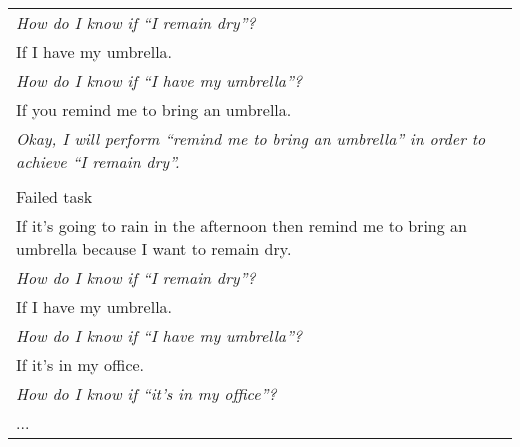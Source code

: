 \begin{table*}
\begin{minipage}{0.6\textwidth}
{\begin{tabular}{p{}}
    \hspace{2em}\textit{How do I know if ``I remain dry''?}\\
    If I have my umbrella.\\
    \hspace{2em}\textit{How do I know if ``I have my umbrella''?}\\
    If you remind me to bring an umbrella.\\
    \hspace{2em}\textit{Okay, I will perform ``remind me to bring an umbrella'' in order to achieve ``I remain dry''.}\\
    \\
    \toprule
    Failed task\\
    \midrule
    If it's going to rain in the afternoon then remind me to bring an umbrella because I want to remain dry.\\
    \hspace{2em}\textit{How do I know if ``I remain dry''?}\\
    If I have my umbrella.\\
    \hspace{2em}\textit{How do I know if ``I have my umbrella''?}\\
    If it's in my office.\\
    \hspace{2em}\textit{How do I know if ``it's in my office''?}\\
    ...
    \\
    \bottomrule
    \end{tabular}
    }
\end{minipage}
\end{table*}